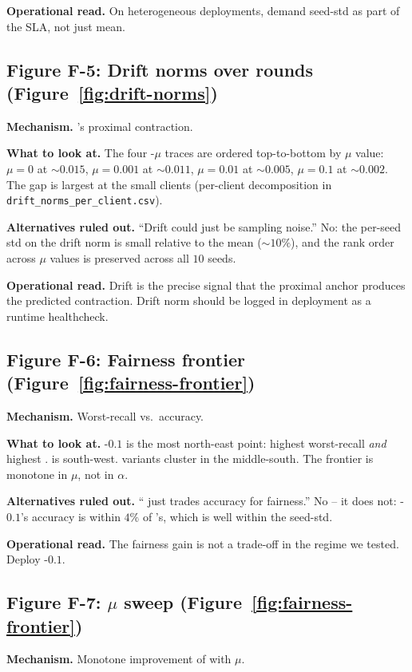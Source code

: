 \textbf{Operational read.} On heterogeneous deployments, demand
seed-std as part of the SLA, not just mean.

\subsection{Figure F-5: Drift norms over rounds
(Figure~\ref{fig:drift-norms})}
\textbf{Mechanism.} \fedprox{}'s proximal contraction.

\textbf{What to look at.} The four \fedprox{}-$\mu$ traces are
ordered top-to-bottom by $\mu$ value: $\mu\!=\!0$ at $\sim$$0.015$,
$\mu\!=\!0.001$ at $\sim$$0.011$, $\mu\!=\!0.01$ at $\sim$$0.005$,
$\mu\!=\!0.1$ at $\sim$$0.002$. The gap is largest at the small
clients (per-client decomposition in
\texttt{drift\_norms\_per\_client.csv}).

\textbf{Alternatives ruled out.} ``Drift could just be sampling
noise.'' No: the per-seed std on the drift norm is small relative
to the mean ($\sim$$10\%$), and the rank order across $\mu$ values
is preserved across all $10$ seeds.

\textbf{Operational read.} Drift is the precise signal that the
proximal anchor produces the predicted contraction. Drift norm
should be logged in deployment as a runtime healthcheck.

\subsection{Figure F-6: Fairness frontier
(Figure~\ref{fig:fairness-frontier})}
\textbf{Mechanism.} Worst-recall vs.\ accuracy.

\textbf{What to look at.} \fedprox{}-$0.1$ is the most
north-east point: highest worst-recall \emph{and} highest
\auprc{}. \fedavg{} is south-west. \cvar{} variants cluster in the
middle-south. The frontier is monotone in $\mu$, not in $\alpha$.

\textbf{Alternatives ruled out.} ``\fedprox{} just trades accuracy
for fairness.'' No -- it does not: \fedprox{}-$0.1$'s accuracy is
within $4\%$ of \fedavg{}'s, which is well within the seed-std.

\textbf{Operational read.} The fairness gain is not a trade-off
in the regime we tested. Deploy \fedprox{}-$0.1$.

\subsection{Figure F-7: \fedprox{} $\mu$ sweep
(Figure~\ref{fig:fairness-frontier})}
\textbf{Mechanism.} Monotone improvement of \auprc{} with $\mu$.

